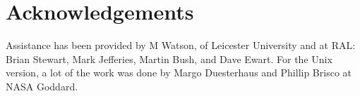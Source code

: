 \normalsize

\section{\label{se:acknowledgements}Acknowledgements}

Assistance has been provided by M Watson, of Leicester University
and at RAL: Brian Stewart, Mark Jefferies, Martin Bush, and Dave Ewart.
For the Unix version, a lot of the work was done by Margo Duesterhaus and
Phillip Brisco at NASA Goddard.


